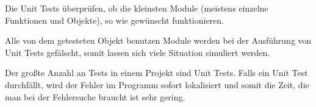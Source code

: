 
Die Unit Tests überprüfen, ob die kleinsten Module (meistens einzelne Funktionen und Objekte), 
so wie gewünscht funktionieren. 

Alle von dem getesteten Objekt benutzen Module werden bei der Ausführung von Unit Tests gefälscht,
somit lassen sich viele Situation simuliert werden. 

Der großte Anzahl an Tests in einem Projekt sind Unit Tests. 
Falls ein Unit Test durchfällt, wird der Fehler im Programm sofort 
lokalisiert und somit die Zeit, die man bei der Fehlersuche braucht ist sehr gering.